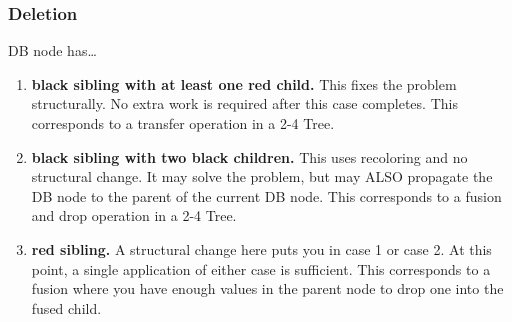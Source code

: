 \begin{enumerate}
{%
        }
\end{enumerate}

\subsubsection*{Deletion}

DB node has\ldots
\begin{enumerate}%
    \item {\bfseries\color{black}black sibling with at least one red child.}
        This fixes the problem structurally. No extra work is required
        after this case completes. This corresponds to a transfer operation in a 2-4 Tree.
    \item {\bfseries\color{black}black sibling with two black children.}
        This uses recoloring and no structural change. It may solve the problem, but
        may ALSO propagate the DB node to the parent of the current DB node. This corresponds
        to a fusion and drop operation in a 2-4 Tree.
    \item {\bfseries\color{black}red sibling.}
        A structural change here puts you in case 1 or case 2.
        At this point, a single application of either case is sufficient.
        This corresponds to a fusion where you have enough values in the parent node to drop
        one into the fused child.
\end{enumerate}

